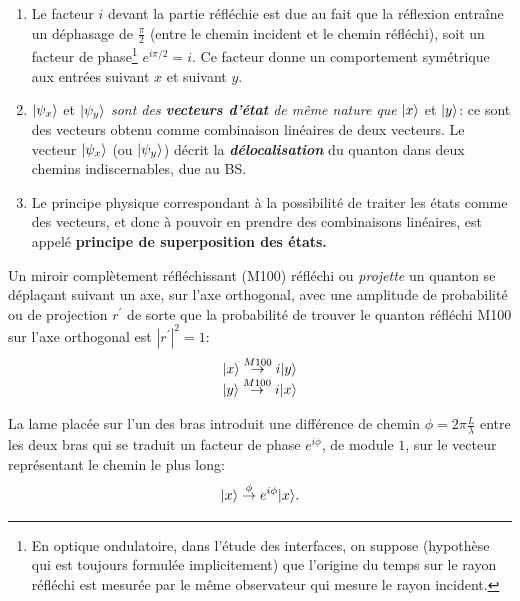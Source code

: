 \begin{enumerate}
\item Le facteur $i$ devant la partie réfléchie est due au fait que la
réflexion entraîne un déphasage de $\frac{\pi}{2}$ (entre le chemin incident
et le chemin réfléchi), soit un facteur de phase\footnote{En optique
ondulatoire, dans l'étude des interfaces, on suppose (hypothèse qui est
toujours formulée implicitement) que l'origine du temps sur le rayon réfléchi
est mesurée par le même observateur qui mesure le rayon incident.} $e^{i\pi
/2}=i$. Ce facteur donne un comportement symétrique aux entrées suivant $x$ et
suivant $y$.

\item $\vert\psi_{x}\rangle$ et $\vert\psi_{y}\rangle$ \emph{sont des \textbf{vecteurs
d'état} de même nature que} $\vert x\rangle$ et $\vert y\rangle$: ce sont des vecteurs
obtenu comme combinaison linéaires de deux vecteurs. Le vecteur $\vert\psi_{x}\rangle
$ (ou $\vert\psi_{y}\rangle$) décrit la \emph{\textbf{délocalisation}} du quanton
dans deux chemins indiscernables, due au BS.

\item Le principe physique correspondant à la possibilité de traiter les états
comme des vecteurs, et donc à pouvoir en prendre des combinaisons linéaires,
est appelé \textbf{principe de superposition des états.}
\end{enumerate}

Un miroir complètement réfléchissant (M100) réfléchi ou \emph{projette} un
quanton se déplaçant suivant un axe, sur l'axe orthogonal, avec une amplitude
de probabilité ou de projection $r^{\prime}$ de sorte que la probabilité de
trouver le quanton réfléchi M100 sur l'axe orthogonal est $|r^{\prime}|^{2}=1$:%
\begin{equation}%
\begin{array}
[c]{c}%
\ket{x} \overset{M100}{\rightarrow}i\ket{y}\\
\ket{y} \overset{M100}{\rightarrow}i\ket{x}
\end{array}
\end{equation}

La lame placée sur l'un des bras introduit une différence de chemin $\phi
=2\pi\frac{L}{\lambda}$ entre les deux bras qui se traduit un facteur de phase
$e^{i\phi}$, de module $1$, sur le vecteur représentant le chemin le plus
long:%
\begin{equation}
\vert x\rangle \overset{\phi}{\rightarrow}e^{i\phi}\vert x\rangle.
\end{equation}

